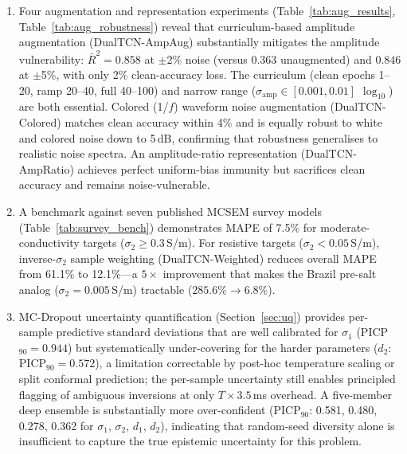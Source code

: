\documentclass[journal]{IEEEtran}
\begin{document}
\begin{enumerate}[leftmargin=2em, itemsep=4pt]
  \item Four augmentation and representation experiments
  (Table~\ref{tab:aug_results}, Table~\ref{tab:aug_robustness}) reveal
  that curriculum-based amplitude augmentation (DualTCN-AmpAug)
  substantially mitigates the amplitude vulnerability:
  $\bar{R}^2 = 0.858$ at $\pm$2\% noise (versus $0.363$
  unaugmented) and $0.846$ at $\pm$5\%, with only 2\% clean-accuracy
  loss.  The curriculum (clean epochs 1--20, ramp 20--40, full
  40--100) and narrow range ($\sigma_\mathrm{amp} \in [0.001, 0.01]$
  $\log_{10}$) are both essential.  Colored (1/$f$) waveform noise
  augmentation (DualTCN-Colored) matches clean accuracy within 4\%
  and is equally robust to white and colored noise down to 5\,dB,
  confirming that robustness generalises to realistic noise spectra.
  An amplitude-ratio representation (DualTCN-AmpRatio) achieves
  perfect uniform-bias immunity but sacrifices clean accuracy and
  remains noise-vulnerable.

  \item A benchmark against seven published MCSEM survey models
  (Table~\ref{tab:survey_bench}) demonstrates MAPE of 7.5\% for
  moderate-conductivity targets ($\sigma_2 \geq 0.3$\,S/m).  For
  resistive targets ($\sigma_2 < 0.05$\,S/m), inverse-$\sigma_2$
  sample weighting (DualTCN-Weighted) reduces overall MAPE from
  61.1\% to 12.1\%---a $5\times$ improvement that makes the Brazil
  pre-salt analog ($\sigma_2 = 0.005$\,S/m) tractable
  ($285.6\% \to 6.8\%$).

  \item MC-Dropout uncertainty quantification
  (Section~\ref{sec:uq}) provides per-sample predictive standard
  deviations that are well calibrated for $\sigma_1$
  (PICP$_{90} = 0.944$) but systematically under-covering for the
  harder parameters ($d_2$: PICP$_{90} = 0.572$), a limitation
  correctable by post-hoc temperature scaling or split conformal
  prediction; the per-sample uncertainty still enables principled
  flagging of ambiguous inversions at only $T \times 3.5$\,ms
  overhead.  A five-member deep ensemble is substantially more
  over-confident (PICP$_{90}$: 0.581, 0.480, 0.278, 0.362 for
  $\sigma_1$, $\sigma_2$, $d_1$, $d_2$), indicating that
  random-seed diversity alone is insufficient to capture the true
  epistemic uncertainty for this problem.
\end{enumerate}
\end{document}
